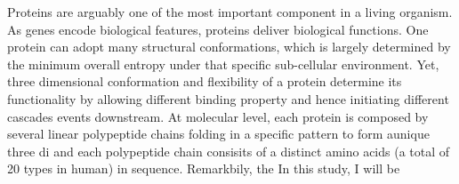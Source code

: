 Proteins are arguably one of the most important component in a living organism. As genes encode biological features, proteins deliver biological functions. One protein can adopt many structural conformations, which is largely determined by the minimum overall entropy under that specific sub-cellular environment. Yet, three dimensional conformation and flexibility of a protein determine its functionality by allowing different binding property and hence initiating different cascades events downstream. At molecular level, each protein is composed by several linear polypeptide chains folding in a specific pattern to form aunique three di and each polypeptide chain consisits of a distinct amino acids (a total of 20 types in human) in sequence. Remarkbily, the  In this study, I will be 